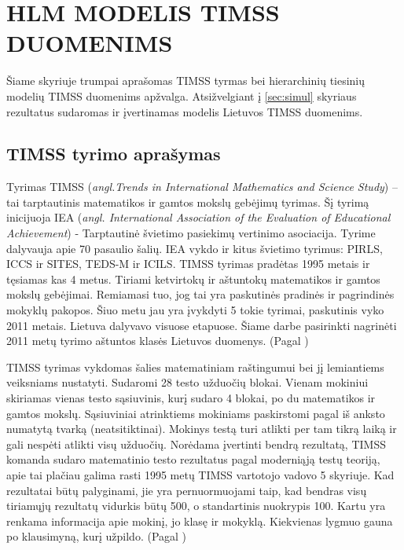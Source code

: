 \documentclass[12pt,a4paper]{article}
\begin{document}
\newpage
\section{HLM MODELIS TIMSS DUOMENIMS} \label{sec:timss}
\indent Šiame skyriuje trumpai aprašomas TIMSS tyrmas bei hierarchinių tiesinių modelių TIMSS duomenims apžvalga. Atsižvelgiant į \ref{sec:simul} skyriaus rezultatus sudaromas ir įvertinamas modelis Lietuvos TIMSS duomenims.

\subsection{TIMSS tyrimo aprašymas} \label{subsec:timss1}

\indent Tyrimas TIMSS (\textit{angl.Trends in International Mathematics and Science Study}) – tai tarptautinis matematikos ir gamtos mokslų gebėjimų tyrimas. Šį tyrimą inicijuoja IEA (\textit{angl. International Association of the Evaluation of Educational Achievement}) - Tarptautinė švietimo pasiekimų vertinimo asociacija. Tyrime dalyvauja apie 70 pasaulio šalių. IEA vykdo ir kitus švietimo tyrimus: PIRLS, ICCS ir SITES, TEDS-M ir ICILS. TIMSS tyrimas pradėtas 1995 metais ir tęsiamas kas 4 metus. Tiriami ketvirtokų ir aštuntokų matematikos ir gamtos mokslų gebėjimai. Remiamasi tuo, jog tai yra paskutinės pradinės ir pagrindinės mokyklų pakopos. Šiuo metu jau yra įvykdyti 5 tokie tyrimai, paskutinis vyko 2011 metais. Lietuva dalyvavo visuose etapuose. Šiame darbe pasirinkti nagrinėti 2011 metų tyrimo aštuntos klasės Lietuvos duomenys. (Pagal \cite{timss2011lt})

\indent TIMSS tyrimas vykdomas šalies matematiniam raštingumui bei jį lemiantiems veiksniams nustatyti. Sudaromi 28 testo užduočių blokai. Vienam mokiniui skiriamas vienas testo sąsiuvinis, kurį sudaro 4 blokai, po du matematikos ir gamtos mokslų. Sąsiuviniai atrinktiems mokiniams paskirstomi pagal iš anksto numatytą tvarką (neatsitiktinai). Mokinys testą turi atlikti per tam tikrą laiką ir gali nespėti atlikti visų užduočių. Norėdama įvertinti bendrą rezultatą, TIMSS komanda sudaro matematinio testo rezultatus pagal moderniąją testų teoriją, apie tai plačiau galima rasti 1995 metų TIMSS vartotojo vadovo \cite{timss1995} 5 skyriuje. Kad rezultatai būtų palyginami, jie yra pernuormuojami taip, kad bendras visų tiriamųjų rezultatų vidurkis būtų 500, o standartinis nuokrypis 100. Kartu yra renkama informacija apie mokinį, jo klasę ir mokyklą. Kiekvienas lygmuo gauna po klausimyną, kurį užpildo. (Pagal \cite{timss2011lt})
\end{document}

